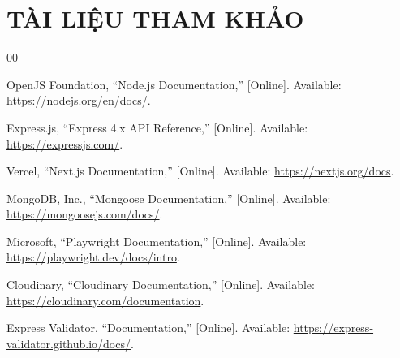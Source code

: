 \clearpage
\section*{TÀI LIỆU THAM KHẢO}
\begin{thebibliography}{00}
	\small
	\raggedright
	\sloppy
	\setlength{\itemsep}{0.45em}

	OpenJS Foundation, ``Node.js Documentation,'' [Online]. Available: \url{https://nodejs.org/en/docs/}.

	Express.js, ``Express 4.x API Reference,'' [Online]. Available: \url{https://expressjs.com/}.

	Vercel, ``Next.js Documentation,'' [Online]. Available: \url{https://nextjs.org/docs}.

	MongoDB, Inc., ``Mongoose Documentation,'' [Online]. Available: \url{https://mongoosejs.com/docs/}.

	Microsoft, ``Playwright Documentation,'' [Online]. Available: \url{https://playwright.dev/docs/intro}.

	Cloudinary, ``Cloudinary Documentation,'' [Online]. Available: \url{https://cloudinary.com/documentation}.

	Express Validator, ``Documentation,'' [Online]. Available: \url{https://express-validator.github.io/docs/}.

\end{thebibliography}
